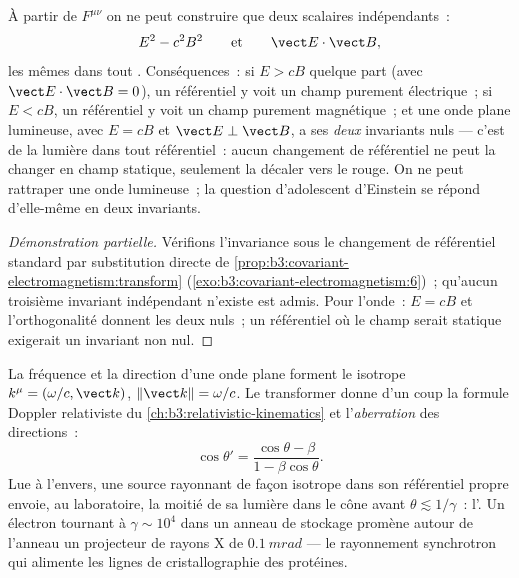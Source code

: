 \begin{proposition}\label{prop:b3:covariant-electromagnetism:invariants}
À partir de $F^{\mu\nu}$ on ne peut construire que deux scalaires indépendants~:
\[
E^2 - c^2B^2
\qquad\text{et}\qquad
\vect E\cdot\vect B ,
\]
les mêmes dans tout . Conséquences~: si $E > cB$
quelque part (avec $\vect E\cdot\vect B = 0$), un référentiel y voit un
champ purement électrique~; si $E < cB$, un référentiel y voit un champ
purement magnétique~; et une onde plane lumineuse, avec $E = cB$ et
$\vect E\perp\vect B$, a ses \emph{deux} invariants nuls --- c'est de
la lumière dans tout référentiel~: aucun changement de référentiel ne
peut la changer en champ statique, seulement la décaler vers le rouge.
On ne peut rattraper une onde lumineuse~; la question d'adolescent
d'Einstein se répond d'elle-même en deux invariants.
\end{proposition}

\begin{proof}[Démonstration partielle]
Vérifions l'invariance sous le changement de référentiel standard par
substitution directe de
\cref{prop:b3:covariant-electromagnetism:transform}
(\cref{exo:b3:covariant-electromagnetism:6})~; qu'aucun troisième
invariant indépendant n'existe est admis. Pour l'onde~: $E = cB$ et
l'orthogonalité donnent les deux nuls~; un référentiel où le champ
serait statique exigerait un invariant non nul.
\end{proof}

\begin{proposition}\label{prop:b3:covariant-electromagnetism:wavevector}
La fréquence et la direction d'une onde plane forment le 
isotrope $k^\mu = (\omega/c, \vect k)$, $\|\vect k\| = \omega/c$. Le
transformer donne d'un coup la formule Doppler relativiste du
\cref{ch:b3:relativistic-kinematics} et l'\emph{aberration} des
directions~:
\[
\cos\theta' = \frac{\cos\theta - \beta}{1 - \beta\cos\theta} .
\]
Lue à l'envers, une source rayonnant de façon isotrope dans son
référentiel propre envoie, au laboratoire, la moitié de sa lumière dans le cône avant $\theta
\lesssim 1/\gamma$~: l'\emph{}. Un électron tournant à
$\gamma \sim 10^4$ dans un anneau de stockage promène autour de
l'anneau un projecteur de rayons X de $\qty{0.1}{mrad}$ --- le
rayonnement synchrotron qui alimente les lignes de
cristallographie des protéines.
\end{proposition}

